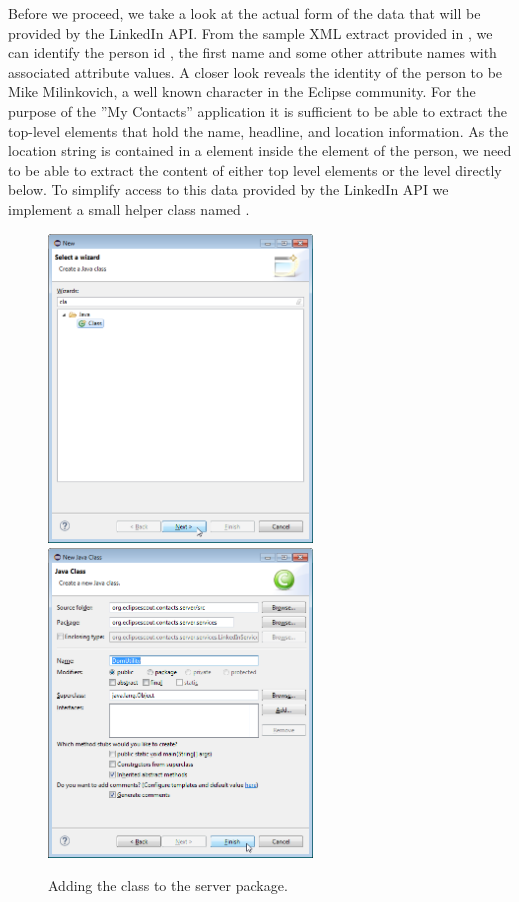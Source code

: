 \documentclass[a4paper,10pt,twoside]{book}
\begin{document}
Before we proceed, we take a look at the actual form of the data that will be provided by the LinkedIn API. 
From the sample XML extract provided in , we can identify the person id , the first name  and some other attribute names with associated attribute values. 
A closer look reveals the identity of the person to be Mike Milinkovich, a well known character in the Eclipse community. 
For the purpose of the ''My Contacts'' application it is sufficient to be able to extract the top-level elements that hold the name, headline, and location information. 
As the location string is contained in a  element inside the  element of the person, we need to be able to extract the content of either top level elements or the level directly below. 
To simplify access to this data provided by the LinkedIn API we implement a small helper class named . 

\begin{figure}
\includegraphics[width=7cm]{new_class_domutil_1.png} \hspace{5mm}
\includegraphics[width=7cm]{new_class_domutil_2.png}
\caption{Adding the  class to the server package.}
\end{figure}
\end{document}
